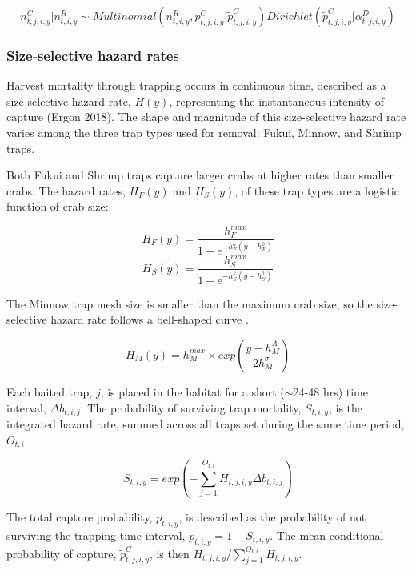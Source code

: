\documentclass{article}
\begin{document}
\begin{equation}
n^C_{t,j,i,y} | n^R_{t,i,y} \sim Multinomial(n^R_{t,i,y}, p^C_{t,j,i,y}|\tilde{p}^C_{t,j,i,y})Dirichlet(\tilde{p}^C_{t,j,i,y}| \alpha^D_{t,j,i,y})
\end{equation}

\subsubsection*{Size-selective hazard rates}

Harvest mortality through trapping occurs in continuous time, described as a size-selective hazard rate, $H(y)$, representing the instantaneous intensity of capture (Ergon 2018). The shape and magnitude of this size-selective hazard rate varies among the three trap types used for removal: Fukui, Minnow, and Shrimp traps.

Both Fukui and Shrimp traps capture larger crabs at higher rates than smaller crabs. The hazard rates, $H_F(y)$ and $H_S(y)$, of these trap types are a logistic function of crab size:

\begin{equation}
H_F(y) = \frac{h^{max}_F}{1+e^{-h^k_F(y-h^0_F)}}
\end{equation}
\begin{equation}
H_S(y) = \frac{h^{max}_S}{1+e^{-h^k_S(y-h^0_S)}}
\end{equation}

The Minnow trap mesh size is smaller than the maximum crab size, so the size-selective hazard rate follows a bell-shaped curve \parencite{jorgensen2009size}.

\begin{equation}
H_M(y) = h^{max}_M \times exp(\frac{y-h^{A}_M}{2 h^{\sigma}_M})
\end{equation}

Each baited trap, $j$, is placed in the habitat for a short ($\sim$24-48 hrs) time interval, $\Delta b_{t,i,j}$. The probability of surviving trap mortality, $S_{t,i,y}$, is the integrated hazard rate, summed across all traps set during the same time period, $O_{t,i}$.

\begin{equation}
S_{t,i,y} = exp(-\sum_{j=1}^{O_{t,i}} H_{t,j,i,y}\Delta b_{t,i,j})
\end{equation}

The total capture probability, $p_{t,i,y}$, is described as the probability of not surviving the trapping time interval, $p_{t,i,y} = 1-S_{t,i,y}$. The mean conditional probability of capture, $\tilde{p}^C_{t,j,i,y}$, is then $H_{t,j,i,y}/\sum_{j=1}^{O_{t,i}}H_{t,j,i,y}$.
\end{document}
